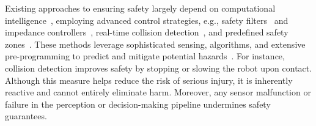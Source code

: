 Existing approaches to ensuring safety largely depend on computational intelligence~\cite{ahn2024autort, sermanet2025generatingrobotconstitutions}, employing advanced control strategies, e.g., safety filters~\citep{ames2016control} and impedance controllers~\citep{khatib1987unified}, real-time collision detection~\citep{haddadin2017robot}, and predefined safety zones~\citep{zhao2024potential}. These methods leverage sophisticated sensing, algorithms, and extensive pre-programming to predict and mitigate potential hazards~\citep{fragapane2021planning}. For instance, collision detection improves safety by stopping or slowing the robot upon contact. Although this measure helps reduce the risk of serious injury, it is inherently reactive and cannot entirely eliminate harm. Moreover, any sensor malfunction or failure in the perception or decision-making pipeline undermines safety guarantees.
